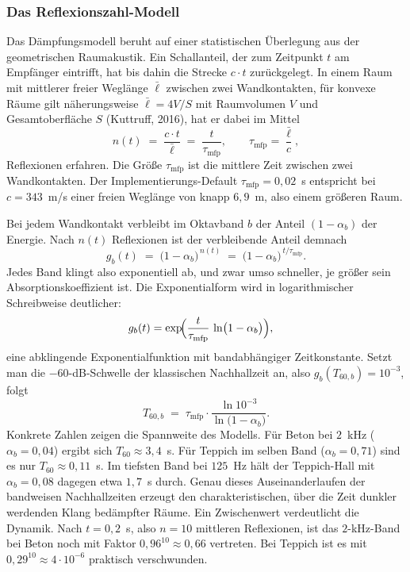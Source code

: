 \subsubsection{Das Reflexionszahl-Modell}
\label{subsubsec:reflexionsmodell}

Das Dämpfungsmodell beruht auf einer statistischen Überlegung aus der
geometrischen Raumakustik. Ein Schallanteil, der zum Zeitpunkt $t$ am Empfänger
eintrifft, hat bis dahin die Strecke $c \cdot t$ zurückgelegt. In einem Raum mit
mittlerer freier Weglänge $\bar{\ell}$ zwischen zwei Wandkontakten, für konvexe
Räume gilt näherungsweise $\bar{\ell} = 4V/S$ mit Raumvolumen $V$ und
Gesamtoberfläche $S$ (Kuttruff, 2016), hat er dabei im Mittel
\[
    n(t) \;=\; \frac{c \cdot t}{\bar{\ell}} \;=\; \frac{t}{\tau_{\mathrm{mfp}}},
    \qquad \tau_{\mathrm{mfp}} = \frac{\bar{\ell}}{c},
\]
Reflexionen erfahren. Die Größe $\tau_{\mathrm{mfp}}$ ist die mittlere Zeit
zwischen zwei Wandkontakten. Der Implementierungs-Default
$\tau_{\mathrm{mfp}} = 0{,}02$~s entspricht bei $c = 343$~m/s einer freien
Weglänge von knapp $6{,}9$~m, also einem größeren Raum.

Bei jedem Wandkontakt verbleibt im Oktavband $b$ der Anteil $(1 - \alpha_b)$
der Energie. Nach $n(t)$ Reflexionen ist der verbleibende Anteil demnach
\[
    g_b(t)
    \;=\; \bigl(1 - \alpha_b\bigr)^{\,n(t)}
    \;=\; \bigl(1 - \alpha_b\bigr)^{\,t / \tau_{\mathrm{mfp}}}.
\]
Jedes Band klingt also exponentiell ab, und zwar umso schneller, je größer sein
Absorptionskoeffizient ist. Die Exponentialform wird in logarithmischer
Schreibweise deutlicher:
\begin{align*}
    g_b(t) &= \exp\!\Bigl(\frac{t}{\tau_{\mathrm{mfp}}}\,
        \ln\bigl(1 - \alpha_b\bigr)\Bigr),
\end{align*}
eine abklingende Exponentialfunktion mit bandabhängiger Zeitkonstante. Setzt man
die $-60$-dB-Schwelle der klassischen Nachhallzeit an, also
$g_b(T_{60,b}) = 10^{-3}$, folgt
\[
    T_{60,b} \;=\; \tau_{\mathrm{mfp}} \cdot
        \frac{\ln 10^{-3}}{\ln\bigl(1 - \alpha_b\bigr)}.
\]
Konkrete Zahlen zeigen die Spannweite des Modells. Für Beton bei $2$~kHz
($\alpha_b = 0{,}04$) ergibt sich $T_{60} \approx 3{,}4$~s. Für Teppich im selben
Band ($\alpha_b = 0{,}71$) sind es nur $T_{60} \approx 0{,}11$~s. Im tiefsten
Band bei $125$~Hz hält der Teppich-Hall mit $\alpha_b = 0{,}08$ dagegen etwa
$1{,}7$~s durch. Genau dieses Auseinanderlaufen der bandweisen Nachhallzeiten
erzeugt den charakteristischen, über die Zeit dunkler werdenden Klang bedämpfter
Räume. Ein Zwischenwert verdeutlicht die Dynamik. Nach $t = 0{,}2$~s, also
$n = 10$ mittleren Reflexionen, ist das $2$-kHz-Band bei Beton noch mit Faktor
$0{,}96^{10} \approx 0{,}66$ vertreten. Bei Teppich ist es mit
$0{,}29^{10} \approx 4 \cdot 10^{-6}$ praktisch verschwunden.

